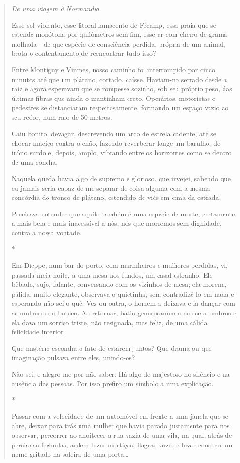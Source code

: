 \begin{quote}
\emph{De uma viagem à Normandia}

Esse sol violento, esse litoral lamacento de Fécamp, essa praia que se
estende monótona por quilômetros sem fim, esse ar com cheiro de grama
molhada - de que espécie de consciência perdida, própria de um animal,
brota o contentamento de reencontrar tudo isso?

Entre Montigny e Vinmes, nosso caminho foi interrompido por cinco
minutos até que um plátano, cortado, caísse. Haviam-no serrado desde a
raiz e agora esperavam que se rompesse sozinho, sob seu próprio peso,
das últimas fibras que ainda o mantinham ereto. Operários, motoristas e
pedestres se distanciaram respeitosamente, formando um espaço vazio ao
seu redor, num raio de 50 metros.

Caiu bonito, devagar, descrevendo um arco de estrela cadente, até se
chocar maciço contra o chão, fazendo reverberar longe um barulho, de
início surdo e, depois, amplo, vibrando entre os horizontes como se
dentro de uma concha.

Naquela queda havia algo de supremo e glorioso, que invejei, sabendo que
eu jamais seria capaz de me separar de coisa alguma com a mesma
concórdia do tronco de plátano, estendido de viés em cima da estrada.

Precisava entender que aquilo também é uma espécie de morte, certamente
a mais bela e mais inacessível a nós, nós que morremos sem dignidade,
contra a nossa vontade.

*

Em Dieppe, num bar do porto, com marinheiros e mulheres perdidas, vi,
passada meia-noite, a uma mesa nos fundos, um casal estranho. Ele
bêbado, sujo, falante, conversando com os vizinhos de mesa; ela morena,
pálida, muito elegante, observava-o quietinha, sem contradizê-lo em nada
e esperando não sei o quê. Vez ou outra, o homem a deixava e ia dançar
com as mulheres do boteco. Ao retornar, batia generosamente nos seus
ombros e ela dava um sorriso triste, não resignada, mas feliz, de uma
cálida felicidade interior.

Que mistério escondia o fato de estarem juntos? Que drama ou que
imaginação pulsava entre eles, unindo-os?

Não sei, e alegro-me por não saber. Há algo de majestoso no silêncio e
na ausência das pessoas. Por isso prefiro um símbolo a uma explicação.

*

Passar com a velocidade de um automóvel em frente a uma janela que se
abre, deixar para trás uma mulher que havia parado justamente para nos
observar, percorrer ao anoitecer a rua vazia de uma vila, na qual, atrás
de persianas fechadas, ardem luzes mortiças, flagrar vozes e levar
conosco um nome gritado na soleira de uma porta\ldots{}


\end{quote}
